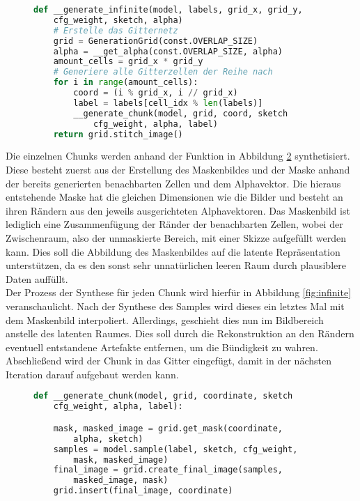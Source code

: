 \begin{figure}[H]
\begin{lstlisting}[language=python]
def __generate_infinite(model, labels, grid_x, grid_y,
    cfg_weight, sketch, alpha)
    # Erstelle das Gitternetz
    grid = GenerationGrid(const.OVERLAP_SIZE)
    alpha = __get_alpha(const.OVERLAP_SIZE, alpha)
    amount_cells = grid_x * grid_y
    # Generiere alle Gitterzellen der Reihe nach
    for i in range(amount_cells):
        coord = (i % grid_x, i // grid_x)
        label = labels[cell_idx % len(labels)]
        __generate_chunk(model, grid, coord, sketch
            cfg_weight, alpha, label)
    return grid.stitch_image()
\end{lstlisting}
    \captionsetup{type=figure}
    \label{fig:gen_infinite}
\end{figure}
Die einzelnen Chunks werden anhand der Funktion in Abbildung \ref{fig:gen_chunk} synthetisiert. Diese besteht zuerst aus der Erstellung des Maskenbildes und der Maske anhand der bereits generierten benachbarten Zellen und dem Alphavektor. Die hieraus entstehende Maske hat die gleichen Dimensionen wie die Bilder und besteht an ihren Rändern aus den jeweils ausgerichteten Alphavektoren. Das Maskenbild ist lediglich eine Zusammenfügung der Ränder der benachbarten Zellen, wobei der Zwischenraum, also der unmaskierte Bereich, mit einer Skizze aufgefüllt werden kann. Dies soll die Abbildung des Maskenbildes auf die latente Repräsentation unterstützen, da es den sonst sehr unnatürlichen leeren Raum durch plausiblere Daten auffüllt. \\
Der Prozess der Synthese für jeden Chunk wird hierfür in Abbildung \ref{fig:infinite} veranschaulicht.
Nach der Synthese des Samples wird dieses ein letztes Mal mit dem Maskenbild interpoliert. Allerdings, geschieht dies nun im Bildbereich anstelle des latenten Raumes. Dies soll durch die Rekonstruktion an den Rändern eventuell entstandene Artefakte entfernen, um die Bündigkeit zu wahren. Abschließend wird der Chunk in das Gitter eingefügt, damit in der nächsten Iteration darauf aufgebaut werden kann.
\begin{figure}[htbp]
\begin{lstlisting}[language=python]
def __generate_chunk(model, grid, coordinate, sketch
    cfg_weight, alpha, label):

    mask, masked_image = grid.get_mask(coordinate, 
        alpha, sketch)
    samples = model.sample(label, sketch, cfg_weight,
        mask, masked_image)
    final_image = grid.create_final_image(samples, 
        masked_image, mask)
    grid.insert(final_image, coordinate)
\end{lstlisting}
    \captionsetup{type=figure}
    \label{fig:gen_chunk}
\end{figure}



